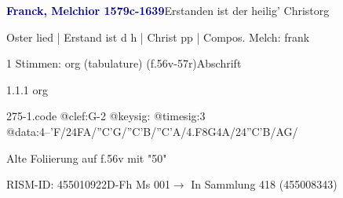 \documentclass[twocolumn]{book}
\begin{document}
\par \vspace{7pt} \textcolor{darkblue}{\textbf{Franck, Melchior  1579c-1639}}\hfillplus{\textbf{[275]}}\newline Erstanden ist der heilig' Christ\newline org
\par \begin{itshape}[f.56v, at left:] Oster lied | Erstand ist d h | Christ pp | Compos. Melch: frank\end{itshape} 
\par \textcolor{darkblue}{}  1 Stimmen: org (tabulature)  (f.56v-57r)\newline Abschrift
\par 1.1.1  org  
\begin{filecontents*}{275-1.code}
@clef:G-2
@keysig:
@timesig:3
@data:4--'F/24FA/''C'G/''C'B/''C'A/4.F8G4A/24''C'B/AG/
\end{filecontents*}
\newline
%
\par Alte Foliierung auf f.56v mit "50"
\par RISM-ID: 455010922\newline D-Fh  Ms 001\newline $\rightarrow$ In Sammlung 418 (455008343)
      
\end{document}
